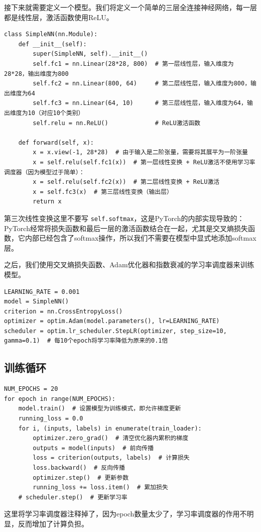接下来就需要定义一个模型。我们将定义一个简单的三层全连接神经网络，每一层都是线性层，激活函数使用ReLU。
\begin{verbatim}
class SimpleNN(nn.Module):
    def __init__(self):
        super(SimpleNN, self).__init__()
        self.fc1 = nn.Linear(28*28, 800)  # 第一层线性层，输入维度为28*28，输出维度为800
        self.fc2 = nn.Linear(800, 64)     # 第二层线性层，输入维度为800，输出维度为64
        self.fc3 = nn.Linear(64, 10)      # 第三层线性层，输入维度为64，输出维度为10（对应10个类别）
        self.relu = nn.ReLU()             # ReLU激活函数

    def forward(self, x):
        x = x.view(-1, 28*28)  # 由于输入是二阶张量，需要将其展平为一阶张量
        x = self.relu(self.fc1(x))  # 第一层线性变换 + ReLU激活不使用学习率调度器（因为模型过于简单）：
        x = self.relu(self.fc2(x))  # 第二层线性变换 + ReLU激活
        x = self.fc3(x)  # 第三层线性变换（输出层）
        return x
\end{verbatim}

第三次线性变换这里不要写 \texttt{self.softmax}，这是PyTorch的内部实现导致的：PyTorch经常将损失函数和最后一层的激活函数结合在一起，尤其是交叉熵损失函数，它内部已经包含了softmax操作，所以我们不需要在模型中显式地添加softmax层。

之后，我们使用交叉熵损失函数、Adam优化器和指数衰减的学习率调度器来训练模型。
\begin{verbatim}
LEARNING_RATE = 0.001
model = SimpleNN()
criterion = nn.CrossEntropyLoss()
optimizer = optim.Adam(model.parameters(), lr=LEARNING_RATE)
scheduler = optim.lr_scheduler.StepLR(optimizer, step_size=10, gamma=0.1)  # 每10个epoch将学习率降低为原来的0.1倍
\end{verbatim}

\subsection{训练循环}

\begin{verbatim}
NUM_EPOCHS = 20
for epoch in range(NUM_EPOCHS):
    model.train()  # 设置模型为训练模式，即允许梯度更新
    running_loss = 0.0
    for i, (inputs, labels) in enumerate(train_loader):
        optimizer.zero_grad()  # 清空优化器内累积的梯度
        outputs = model(inputs)  # 前向传播
        loss = criterion(outputs, labels)  # 计算损失
        loss.backward()  # 反向传播
        optimizer.step()  # 更新参数
        running_loss += loss.item()  # 累加损失
    # scheduler.step()  # 更新学习率
\end{verbatim}
这里将学习率调度器注释掉了，因为epoch数量太少了，学习率调度器的作用不明显，反而增加了计算负担。

